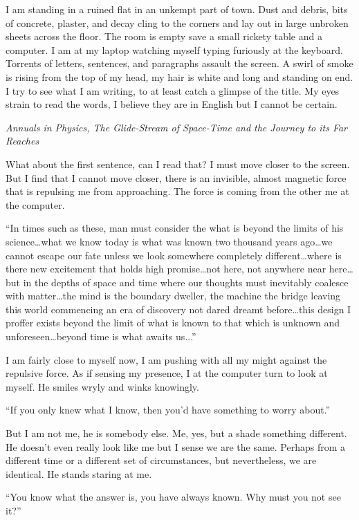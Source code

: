 \documentclass[
]{article}
\begin{document}
I am standing in a ruined flat in an unkempt part of town. Dust and
debris, bits of concrete, plaster, and decay cling to the corners and
lay out in large unbroken sheets across the floor. The room is empty
save a small rickety table and a computer. I am at my laptop watching
myself typing furiously at the keyboard. Torrents of letters, sentences,
and paragraphs assault the screen. A swirl of smoke is rising from the
top of my head, my hair is white and long and standing on end. I try to
see what I am writing, to at least catch a glimpse of the title. My eyes
strain to read the words, I believe they are in English but I cannot be
certain.

\emph{Annuals in Physics, The Glide-Stream of Space-Time and the Journey
to its Far Reaches}

What about the first sentence, can I read that? I must move closer to
the screen. But I find that I cannot move closer, there is an invisible,
almost magnetic force that is repulsing me from approaching. The force
is coming from the other me at the computer.

``In times such as these, man must consider the what is beyond the
limits of his science\ldots what we know today is what was known two
thousand years ago\ldots we cannot escape our fate unless we look
somewhere completely different\ldots where is there new excitement that
holds high promise\ldots not here, not anywhere near here\ldots but in
the depths of space and time where our thoughts must inevitably coalesce
with matter\ldots the mind is the boundary dweller, the machine the
bridge leaving this world commencing an era of discovery not dared
dreamt before\ldots this design I proffer exists beyond the limit of
what is known to that which is unknown and unforeseen\ldots beyond time
is what awaits us...''

I am fairly close to myself now, I am pushing with all my might against
the repulsive force. As if sensing my presence, I at the computer turn
to look at myself. He smiles wryly and winks knowingly.

``If you only knew what I know, then you'd have something to worry
about.''

But I am not me, he is somebody else. Me, yes, but a shade something
different. He doesn't even really look like me but I sense we are the
same. Perhaps from a different time or a different set of circumstances,
but nevertheless, we are identical. He stands staring at me.

``You know what the answer is, you have always known. Why must you not
see it?''
\end{document}
